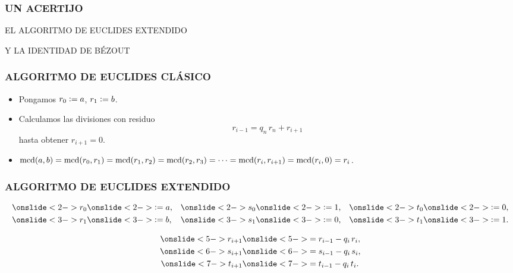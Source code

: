 \begin{frame}
  \frametitle{UN ACERTIJO}

\end{frame}

\begin{frame}

  \vfill

  \begin{center}\huge\headingfont
    EL ALGORITMO DE EUCLIDES EXTENDIDO

    \vspace{1em}

    Y LA IDENTIDAD DE BÉZOUT
  \end{center}

  \vfill
\end{frame}

\begin{frame}
  \frametitle{ALGORITMO DE EUCLIDES CLÁSICO}

  \begin{itemize}
  \item<2-> Pongamos $r_0 \mathrel{\mathop:}= a$, $r_1 \mathrel{\mathop:}= b$.

  \item<3-> Calculamos las divisiones con residuo
    $$r_{i-1} = q_n\,r_n + r_{i+1}$$
    hasta obtener $r_{i+1} = 0$.

  \item<4->
    $\operatorname{mcd} (a,b) = \operatorname{mcd} (r_0,r_1) = \operatorname{mcd} (r_1,r_2) = \operatorname{mcd} (r_2,r_3) = \cdots =
    \operatorname{mcd} (r_i,r_{i+1}) = \operatorname{mcd} (r_i,0) = r_i$.
  \end{itemize}
\end{frame}

\begin{frame}
  \frametitle{ALGORITMO DE EUCLIDES EXTENDIDO}

  \begin{align*}
    \onslide<2->{r_0} & \onslide<2->{\dfn a,} & \onslide<2->{s_0} & \onslide<2->{\dfn 1,} & \onslide<2->{t_0} & \onslide<2->{\dfn 0,} \\
    \onslide<3->{r_1} & \onslide<3->{\dfn b,} & \onslide<3->{s_1} & \onslide<3->{\dfn 0,} & \onslide<3->{t_1} & \onslide<3->{\dfn 1.}
  \end{align*}

  \begin{align*}
    \onslide<5->{r_{i+1}} & \onslide<5->{= r_{i-1} - q_i\,r_i,} \\
    \onslide<6->{s_{i+1}} & \onslide<6->{= s_{i-1} - q_i\,s_i,} \\
    \onslide<7->{t_{i+1}} & \onslide<7->{= t_{i-1} - q_i\,t_i.}
  \end{align*}

\end{frame}

